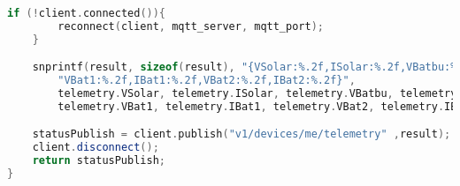 \begin{itemize}
\begin{lstlisting}[language=c++,caption={Funcion \texttt{publishTelemetry}},captionpos=b]
    if (!client.connected()){
        reconnect(client, mqtt_server, mqtt_port);
    }

    snprintf(result, sizeof(result), "{VSolar:%.2f,ISolar:%.2f,VBatbu:%.2f,IBatbu:%.2f,"
        "VBat1:%.2f,IBat1:%.2f,VBat2:%.2f,IBat2:%.2f}", 
        telemetry.VSolar, telemetry.ISolar, telemetry.VBatbu, telemetry.IBatbu, 
        telemetry.VBat1, telemetry.IBat1, telemetry.VBat2, telemetry.IBat2);

    statusPublish = client.publish("v1/devices/me/telemetry" ,result);
    client.disconnect();
    return statusPublish;
}
\end{lstlisting}

\end{itemize}
